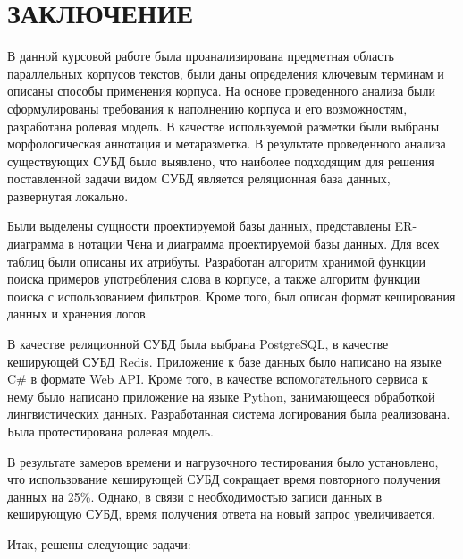 \section*{ЗАКЛЮЧЕНИЕ}

В данной курсовой работе была проанализирована предметная область параллельных корпусов текстов, были даны определения ключевым терминам и описаны способы применения корпуса. 
На основе проведенного анализа были сформулированы требования к наполнению корпуса и его возможностям, разработана ролевая модель. 
В качестве используемой разметки были выбраны морфологическая аннотация и метаразметка. 
В результате проведенного анализа существующих СУБД было выявлено, что наиболее подходящим для решения поставленной задачи видом СУБД является реляционная база данных, развернутая локально.

Были выделены сущности проектируемой базы данных, представлены ER-диаграмма в нотации Чена и диаграмма проектируемой базы данных. 
Для всех таблиц были описаны их атрибуты. 
Разработан алгоритм хранимой функции поиска примеров употребления слова в корпусе, а также алгоритм функции поиска с использованием фильтров. 
Кроме того, был описан формат кеширования данных и хранения логов.

В качестве реляционной СУБД была выбрана PostgreSQL, в качестве кеширующей СУБД Redis. Приложение к базе данных было написано на языке C\# в формате Web API. 
Кроме того, в качестве вспомогательного сервиса к нему было написано приложение на языке Python, занимающееся обработкой лингвистических данных. 
Разработанная система логирования была реализована. 
Была протестирована ролевая модель.

В результате замеров времени и нагрузочного тестирования было установлено, что использование кеширующей СУБД сокращает время повторного получения данных на 25\%. Однако, в связи с необходимостью записи данных в кеширующую СУБД, время получения ответа на новый запрос увеличивается.

Итак, решены следующие задачи:

